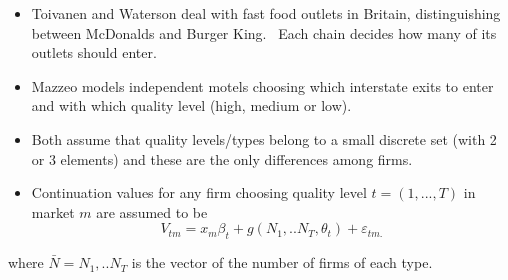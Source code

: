\documentclass[notes=show]{beamer}
\begin{document}
\begin{frame}%


\begin{itemize}
\item Toivanen and Waterson deal with fast food outlets in Britain,
distinguishing between McDonalds and Burger King. \ Each chain decides how
many of its outlets should enter.

\item Mazzeo models independent motels choosing which interstate exits to
enter and with which quality level (high, medium or low).

\item Both assume that quality levels/types belong to a small discrete set
(with 2 or 3 elements) and these are the only differences among firms.

\item Continuation values for any firm choosing quality level $t=(1,...,T)$
in market $m$ are assumed to be 
\begin{equation*}
V_{tm}=x_{m}\beta _{t}+g(N_{1},..N_{T},\theta _{t})+\varepsilon _{tm.}
\end{equation*}
\end{itemize}

where $\bar{N}=N_{1},..N_{T}$ is the vector of the number of firms of each
type.

\end{frame}%
\end{document}
